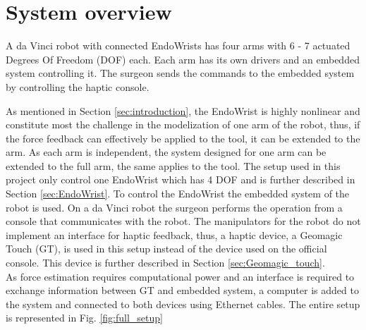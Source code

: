 \section{System overview}\label{sec:system_overview}
A da Vinci robot with connected EndoWrists has four arms with 6 - 7 actuated Degrees Of Freedom (DOF) each. Each arm has its own drivers and an embedded system controlling it. %
The surgeon sends the commands to the embedded system by controlling the haptic console.

As mentioned in Section \ref{sec:introduction}, the EndoWrist is highly nonlinear and constitute most the challenge in the modelization of one arm of the robot, thus, if the force feedback can effectively be applied to the tool, it can be extended to the arm. As each arm is independent, the system designed for one arm can be extended to the full arm, the same applies to the tool. The setup used in this project only control one EndoWrist which has 4 DOF and is further described in Section \ref{sec:EndoWrist}.%
To control the EndoWrist the embedded system of the robot is used. On a da Vinci robot the surgeon performs the operation from a console that communicates with the robot. The manipulators for the robot do not implement an interface for haptic feedback, thus, a haptic device, a Geomagic Touch (GT), is used in this setup instead of the device used on the official console. This device is further described in Section \ref{sec:Geomagic_touch}.\\
As force estimation requires computational power and an interface is required to exchange information between GT and embedded system, a computer is added to the system and connected to both devices using Ethernet cables. The entire setup is represented in Fig. \ref{fig:full_setup}
